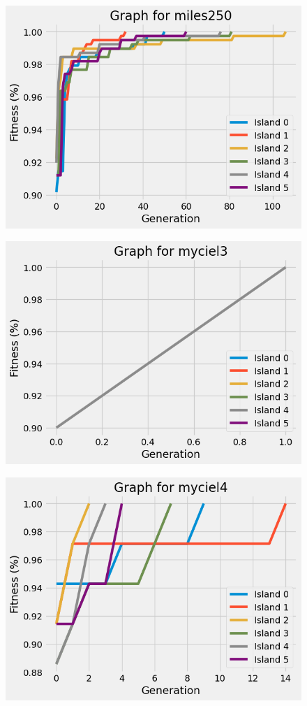 \documentclass{article}
\begin{document}
\begin{multicols}{2}
\begin{figure}[H]
    \includegraphics[scale=0.45]{imgs/convergence/miles250_evolution.png}
\end{figure}
\begin{figure}[H]
    \centering
    \includegraphics[scale=0.45]{imgs/convergence/myciel3_evolution.png}
\end{figure}
\begin{figure}[H]
    \centering
    \includegraphics[scale=0.45]{imgs/convergence/myciel4_evolution.png}

\end{figure}
\end{multicols}
\end{document}
